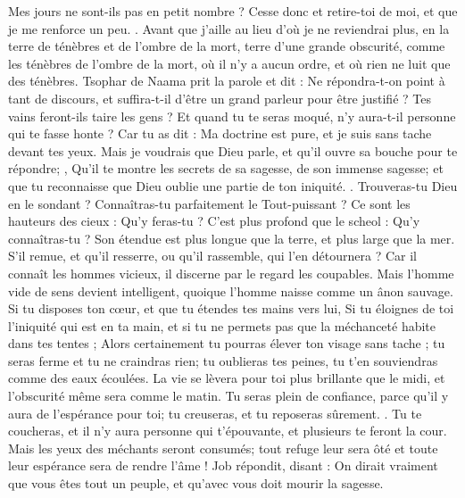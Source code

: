 \begin{multicols}{2}
Mes jours ne sont-ils pas en petit nombre ? Cesse donc et retire-toi de moi, et que je me renforce un peu. .
Avant que j'aille au lieu d'où je ne reviendrai plus, en la terre de ténèbres et de l'ombre de la mort,
terre d'une grande obscurité, comme les ténèbres de l'ombre de la mort, où il n'y a aucun ordre, et où rien ne luit que des ténèbres. 
\VerseOne{}Tsophar de Naama prit la parole et dit :
Ne répondra-t-on point à tant de discours, et suffira-t-il d'être un grand parleur pour être justifié ?
Tes vains feront-ils taire les gens ? Et quand tu te seras moqué, n'y aura-t-il personne qui te fasse honte ?
Car tu as dit : Ma doctrine est pure, et je suis sans tache devant tes yeux. 
Mais je voudrais que Dieu parle, et qu'il ouvre sa bouche pour te répondre; ,
Qu'il te montre les secrets de sa sagesse, de son immense sagesse; et que tu reconnaisse que Dieu oublie une partie de ton iniquité. .
Trouveras-tu Dieu en le sondant ? Connaîtras-tu parfaitement le Tout-puissant ? 
Ce sont les hauteurs des cieux : Qu'y feras-tu ? C'est plus profond que le scheol : Qu'y connaîtras-tu ?
Son étendue est plus longue que la terre, et plus large que la mer.
S'il remue, et qu'il resserre, ou qu'il rassemble, qui l'en détournera ?
Car il connaît les hommes vicieux, il discerne par le regard les coupables.
Mais l'homme vide de sens devient intelligent, quoique l'homme naisse comme un ânon sauvage.
Si tu disposes ton cœur, et que tu étendes tes mains vers lui,
Si tu éloignes de toi l'iniquité qui est en ta main, et si tu ne permets pas que la méchanceté habite dans tes tentes ; 
Alors certainement tu pourras élever ton visage sans tache ; tu seras ferme et tu ne craindras rien;
tu oublieras tes peines, tu t'en souviendras comme des eaux écoulées.
La vie se lèvera pour toi plus brillante que le midi, et l'obscurité même sera comme le matin.
 Tu seras plein de confiance, parce qu'il y aura de l'espérance pour toi; tu creuseras, et tu reposeras sûrement. .
Tu te coucheras, et il n'y aura personne qui t'épouvante, et plusieurs te feront la cour. 
Mais les yeux des méchants seront consumés; tout refuge leur sera ôté et toute leur espérance sera de rendre l'âme !
\VerseOne{}Job répondit, disant :
On dirait vraiment que vous êtes tout un peuple, et qu'avec vous doit mourir la sagesse.

\end{multicols}
